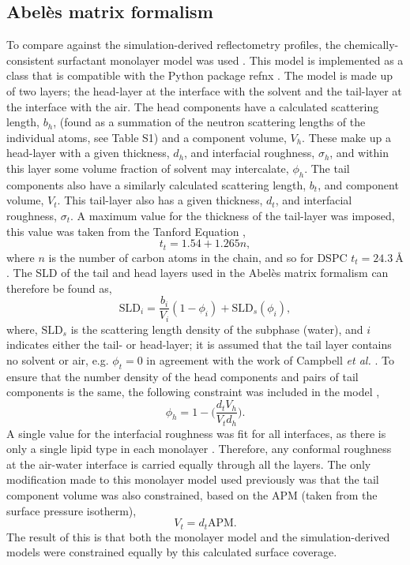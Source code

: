 \documentclass[amsmath,amssymb,twocolumn,superscriptaddress]{revtex4-1}
\begin{document}
\subsection{Abel\`{e}s matrix formalism}
To compare against the simulation-derived reflectometry profiles, the
chemically-consistent surfactant monolayer model was
used \cite{McCluskey2018,McCluskey2018a}.
This model is implemented as a class that is compatible with the Python
package refnx \cite{Nelson2018,refnx}.
The model is made up of two layers; the head-layer at the interface with
the solvent and the tail-layer at the interface with the air.
The head components have a calculated scattering length, $b_h$, (found as a
summation of the neutron scattering lengths of the individual atoms, see
Table S1) and a component volume, $V_h$.
These make up a head-layer with a given thickness, $d_h$, and interfacial
roughness, $\sigma_h$, and within this layer some volume fraction of
solvent may intercalate, $\phi_h$.
The tail components also have a similarly calculated scattering
length, $b_t$, and component volume, $V_t$.
This tail-layer also has a given thickness, $d_t$, and interfacial
roughness, $\sigma_t$.
A maximum value for the thickness of the tail-layer was imposed, this
value was taken from the Tanford Equation \cite{Tanford1980},
%
\begin{equation}
  t_t = 1.54 + 1.265n,
\end{equation}
%
where $n$ is the number of carbon atoms in the chain, and so for
DSPC $t_t = \SI{24.3}{\angstrom}$.
The SLD of the tail and head layers used in the Abel\`{e}s matrix formalism
can therefore be found as,
%
\begin{equation}
  \text{SLD}_i = \frac{b_i}{V_i}(1 - \phi_i) + \text{SLD}_s(\phi_i),
\end{equation}
%
where, $\text{SLD}_s$ is the scattering length density of the subphase
(water), and $i$ indicates either the tail- or head-layer; it is assumed
that the tail layer contains no solvent or air, e.g. $\phi_t = 0$ in
agreement with the work of Campbell \emph{et al.} \cite{Campbell2018}.
To ensure that the number density of the head components and pairs of tail
components is the same, the following constraint was included in the
model \cite{Braun2017},
%
\begin{equation}
  \phi_h = 1 - \bigg(\frac{d_tV_h}{V_td_h}\bigg).
\end{equation}
%
A single value for the interfacial roughness was fit for all interfaces, as
there is only a single lipid type in each monolayer \cite{Campbell2018}.
Therefore, any conformal roughness at the air-water interface is carried
equally through all the layers.
The only modification made to this monolayer model used previously was that
the tail component volume was also constrained, based on the APM (taken
from the surface pressure isotherm),
%
\begin{equation}
  V_t = d_t \text{APM}.
\end{equation}
%
The result of this is that both the monolayer model and the
simulation-derived models were constrained equally by this calculated
surface coverage.
\end{document}
